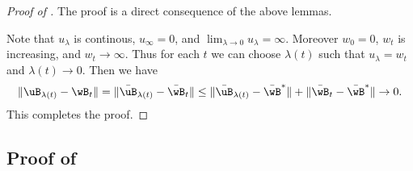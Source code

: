 \documentclass[11pt]{article}
\begin{document}
\begin{proof}[Proof of ]
The proof is a direct consequence of the above lemmas.

Note that $ u_{\lambda}$ is continous, $u_{\infty}=0$, and $\lim_{\lambda\to 0} u_{\lambda} = \infty$. Moreover $w_0=0$, $w_t$ is increasing, and $w_t\to\infty$.
Thus for each $t$ we can choose $\lambda(t)$ such that $ u_{\lambda} =  w_t$ and $\lambda(t)\to 0$. 
Then we have 
\begin{align*}
    \| \uB_{\lambda(t)} - \wB_t\| = \|\bar \uB_{\lambda(t)} - \bar \wB_t\| \le \|\bar\uB_{\lambda(t)} - \bar\wB^*\| +\| \bar \wB_t - \bar \wB^*\| \to 0. 
\end{align*}
This completes the proof.
\end{proof}



\subsection{Proof of \texorpdfstring{}{Theorem 5.3}}\label{sec:proof:path:counter-example}
\end{document}
